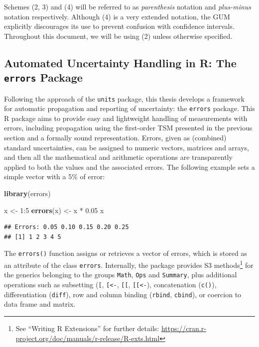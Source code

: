 \documentclass[twoside,nohyper]{tufte-book}
\newenvironment{Shaded}{}{}
\newcommand{\DecValTok}[1]{\textcolor[rgb]{0.25,0.63,0.44}{#1}}
\newcommand{\FloatTok}[1]{\textcolor[rgb]{0.25,0.63,0.44}{#1}}
\newcommand{\KeywordTok}[1]{\textcolor[rgb]{0.00,0.44,0.13}{\textbf{#1}}}
\newcommand{\NormalTok}[1]{#1}
\newcommand{\OperatorTok}[1]{\textcolor[rgb]{0.40,0.40,0.40}{#1}}
\newcommand{\StringTok}[1]{\textcolor[rgb]{0.25,0.44,0.63}{#1}}
\begin{document}
Schemes (2, 3) and (4) will be referred to as \emph{parenthesis} notation and \emph{plus-minus} notation respectively. Although (4) is a very extended notation, the GUM explicitly discourages its use to prevent confusion with confidence intervals. Throughout this document, we will be using (2) unless otherwise specified.

\hypertarget{automated-uncertainty-handling-in-r-the-errors-package}{%
\subsection{\texorpdfstring{Automated Uncertainty Handling in R: The \texttt{errors} Package}{Automated Uncertainty Handling in R: The errors Package}}\label{automated-uncertainty-handling-in-r-the-errors-package}}

Following the approach of the \texttt{units} package, this thesis develops a framework for automatic propagation and reporting of uncertainty: the \texttt{errors} package\cite[0pt]{R-errors}. This R package aims to provide easy and lightweight handling of measurements with errors, including propagation using the first-order TSM presented in the previous section and a formally sound representation. Errors, given as (combined) standard uncertainties, can be assigned to numeric vectors, matrices and arrays, and then all the mathematical and arithmetic operations are transparently applied to both the values and the associated errors. The following example sets a simple vector with a 5\% of error:

\begin{Shaded}
\begin{Highlighting}[]
\KeywordTok{library}\NormalTok{(errors)}

\NormalTok{x <-}\StringTok{ }\DecValTok{1}\OperatorTok{:}\DecValTok{5}
\KeywordTok{errors}\NormalTok{(x) <-}\StringTok{ }\NormalTok{x }\OperatorTok{*}\StringTok{ }\FloatTok{0.05}
\NormalTok{x}
\end{Highlighting}
\end{Shaded}

\begin{verbatim}
## Errors: 0.05 0.10 0.15 0.20 0.25
## [1] 1 2 3 4 5
\end{verbatim}

The \texttt{errors()} function assigns or retrieves a vector of errors, which is stored as an attribute of the class \texttt{errors}. Internally, the package provides S3 methods\footnote{See ``Writing R Extensions'' for further details: \url{https://cran.r-project.org/doc/manuals/r-release/R-exts.html}} for the generics belonging to the groups \texttt{Math}, \texttt{Ops} and \texttt{Summary}, plus additional operations such as subsetting (\texttt{{[}}, \texttt{{[}\textless{}-}, \texttt{{[}{[}}, \texttt{{[}{[}\textless{}-}), concatenation (\texttt{c()}), differentiation (\texttt{diff}), row and column binding (\texttt{rbind}, \texttt{cbind}), or coercion to data frame and matrix.
\end{document}
